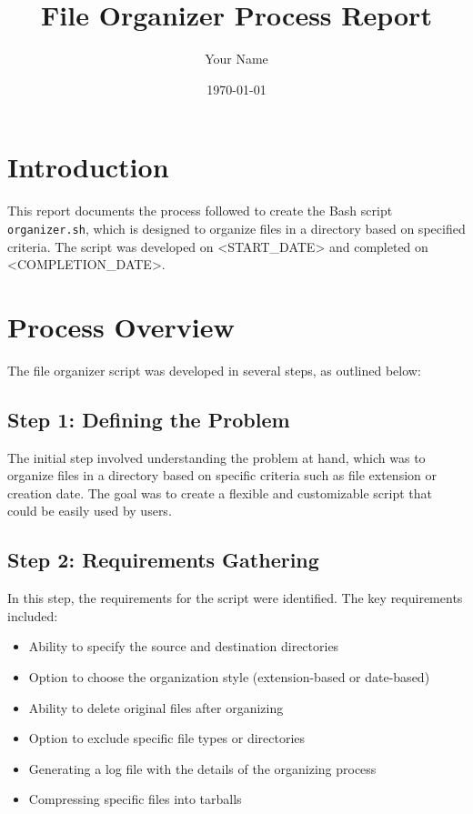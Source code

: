 \documentclass{article}
\begin{document}
\title{File Organizer Process Report}
\author{Your Name}
\date{\today}
\maketitle

\section{Introduction}
This report documents the process followed to create the Bash script \texttt{organizer.sh}, which is designed to organize files in a directory based on specified criteria. The script was developed on <START_DATE> and completed on <COMPLETION_DATE>.

\section{Process Overview}
The file organizer script was developed in several steps, as outlined below:

\subsection{Step 1: Defining the Problem}
The initial step involved understanding the problem at hand, which was to organize files in a directory based on specific criteria such as file extension or creation date. The goal was to create a flexible and customizable script that could be easily used by users.

\subsection{Step 2: Requirements Gathering}
In this step, the requirements for the script were identified. The key requirements included:
\begin{itemize}
  \item Ability to specify the source and destination directories
  \item Option to choose the organization style (extension-based or date-based)
  \item Ability to delete original files after organizing
  \item Option to exclude specific file types or directories
  \item Generating a log file with the details of the organizing process
  \item Compressing specific files into tarballs
\end{itemize}
\end{document}

